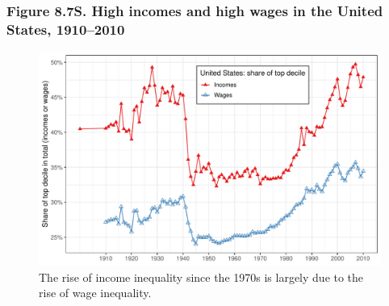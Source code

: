 \documentclass[t]{beamer}\usepackage[]{graphicx}\usepackage[]{color}
\newenvironment{knitrout}{}{} %
\begin{document}
\begin{frame}[label=Figure_8_7S,fragile]
\frametitle{Figure 8.7S. High incomes and high wages in the United States, 1910--2010}
\begin{figure}[t]
\begin{minipage}[b]{\textwidth}
\centering
\begin{knitrout}\footnotesize
{}\color{fgcolor}

{\centering \includegraphics[width=1\linewidth]{figures/color/Figure_8_7S} 

}



\end{knitrout}
\caption{The rise of income inequality since the 1970s is largely due to the rise of wage inequality.}
\end{minipage}
\end{figure}
\end{frame}
\end{document}
